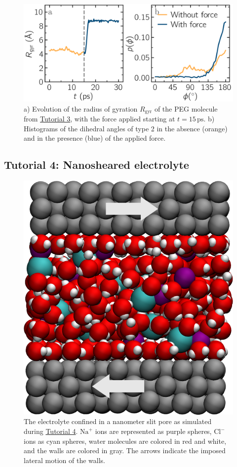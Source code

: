 \documentclass[9pt,tutorial]{livecoms}
\begin{document}
\begin{figure}
\centering
\includegraphics[width=\linewidth]{PEG-distance}
\caption{a) Evolution of
the radius of gyration $R_\text{gyr}$ of the PEG molecule
from \hyperref[all-atom-label]{Tutorial 3}, with the force
applied starting at $t = 15\,\text{ps}$. b) Histograms of the dihedral angles of type 2
in the absence (orange) and in the presence (blue) of the applied force.}
\label{fig:PEG-distance}
\end{figure}

\subsection{Tutorial 4: Nanosheared electrolyte}
\label{sheared-confined-label}

\begin{figure}
\centering
\includegraphics[width=0.55\linewidth]{NANOSHEAR}
\caption{The electrolyte confined in a nanometer slit pore as simulated during
\hyperref[sheared-confined-label]{Tutorial 4}.  $\text{Na}^+$ ions are represented
as purple spheres, $\text{Cl}^-$ ions as cyan spheres, water molecules are colored
in red and white, and the walls are colored in gray.  The arrows indicate the
imposed lateral motion of the walls.}
\label{fig:NANOSHEAR}
\end{figure}
\end{document}
